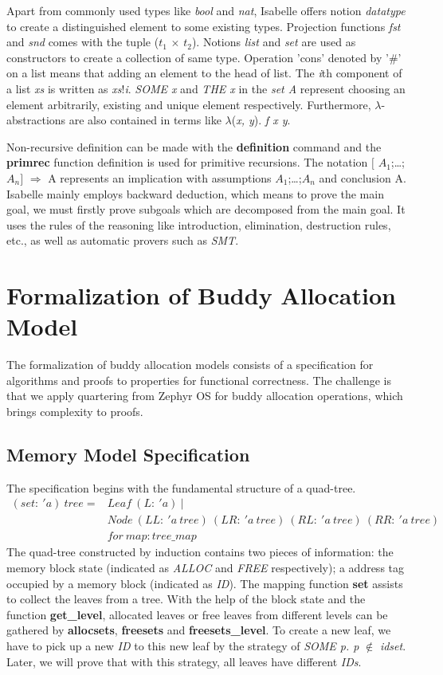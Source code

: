 \documentclass[runningheads]{llncs}
\begin{document}
Apart from commonly used types like \textsl{bool} and \textsl{nat}, Isabelle offers notion \textsl{datatype} to create a distinguished element to some existing types. Projection functions \textsl{fst} and \textsl{snd} comes with the tuple (\textsl{$t_1$} $\times$ \textsl{$t_2$}). Notions \textsl{list} and \textsl{set} are used as constructors to create a collection of same type. Operation 'cons' denoted by '$\#$' on a list means that adding an element to the head of list. The \textsl{i}th component of a list \textsl{xs} is written as \textsl{xs}!\textsl{i}. \textsl{SOME x} and \textsl{THE x} in the \textsl{set A} represent choosing an element arbitrarily, existing and unique element respectively. Furthermore, $\lambda$-abstractions are also contained in terms like $\lambda$(\textsl{x, y}). \textsl{f x y}.

Non-recursive definition can be made with the \textbf{definition} command and the \textbf{primrec} function definition is used for primitive recursions. The notation $\lbrack$ $A_1$;\dots;$A_n$$\rbrack$ $\Longrightarrow$ A represents an implication with assumptions $A_1$;\dots;$A_n$ and conclusion A. Isabelle mainly employs backward deduction, which means to prove the main goal, we must firstly prove subgoals which are decomposed from the main goal. It uses the rules of the reasoning like introduction, elimination, destruction rules, etc., as well as automatic provers such as \textsl{SMT}.


\section{Formalization of Buddy Allocation Model}
The formalization of buddy allocation models consists of a specification for algorithms and proofs to properties for functional correctness. The challenge is that we apply quartering from Zephyr OS for buddy allocation operations, which brings complexity to proofs.

\subsection{Memory Model Specification}
The specification begins with the fundamental structure of a quad-tree.
\begin{align*}
(set:\ 'a)\ tree = &Leaf\ (L:\ 'a)\ | \\
&Node\ (LL:\ 'a\ tree)\ (LR:\ 'a\ tree)\ (RL:\ 'a\ tree)\ (RR:\ 'a\ tree) \\
&for\ map: tree\_map
\end{align*}
The quad-tree constructed by induction contains two pieces of information: the memory block state (indicated as \textsl{ALLOC} and \textsl{FREE} respectively); a address tag occupied by a memory block (indicated as \textsl{ID}). The mapping function \textbf{set} assists to collect the leaves from a tree. With the help of the block state and the function \textbf{get\_level}, allocated leaves or free leaves from different levels can be gathered by \textbf{allocsets}, \textbf{freesets} and \textbf{freesets\_level}. To create a new leaf, we have to pick up a new \textsl{ID} to this new leaf by the strategy of \textsl{SOME p. p} $\notin$ \textsl{idset}. Later, we will prove that with this strategy, all leaves have different \textsl{IDs}.
\end{document}
